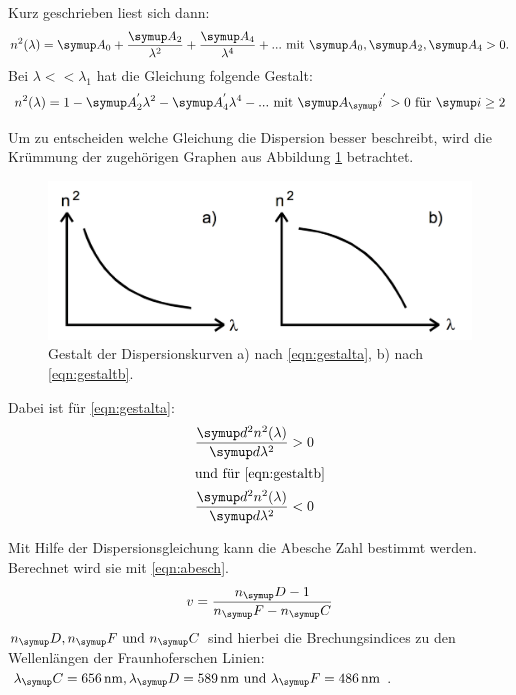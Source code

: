 Kurz geschrieben liest sich dann:
\begin{equation}
  n^2(\lambda) = \g{A}_0 + \frac{\g{A_2}}{\lambda^2} + \frac{\g{A_4}}{\lambda^4} + ...
  \text{~mit~} \g{A}_0, \g{A}_2, \g{A}_4 > 0.
  \label{eqn:gestalta}
\end{equation}
Bei $\lambda << \lambda_1$ hat die Gleichung folgende Gestalt:
\begin{equation}
  n^2(\lambda) = 1- \g{A}_2^{'} \lambda^2 - \g{A}_4^{'} \lambda^4 - ...
  \text{~mit~} \g{A}_\g{i}^{'} > 0 \text{~für~} \g{i} \geq 2
  \label{eqn:gestaltb}
\end{equation}

Um zu entscheiden welche Gleichung die Dispersion besser beschreibt, wird
die Krümmung der zugehörigen Graphen aus Abbildung \ref{fig:Dispersionskurven}
betrachtet.
\begin{figure}
  \centering
  \includegraphics[width = \textwidth]{Pics/Dispersionskurven.pdf}
  \caption{Gestalt der Dispersionskurven a) nach \eqref{eqn:gestalta}, b) nach \eqref{eqn:gestaltb}.}
  \label{fig:Dispersionskurven}
\end{figure}
Dabei ist für \eqref{eqn:gestalta}:
\begin{align*}
  \frac{\g{d}^2 n^2(\lambda)}{\g{d} \lambda^2} &> 0\\
  \intertext{und für \eqref{eqn:gestaltb}}
  \frac{\g{d}^2 n^2(\lambda)}{\g{d} \lambda^2} &< 0
\end{align*}

Mit Hilfe der Dispersionsgleichung kann die Abesche Zahl bestimmt werden.
Berechnet wird sie mit \eqref{eqn:abesch}.
\begin{equation}
  v = \frac{n_\g{D} -1 }{n_\g{F} - n_\g{C}}
  \label{eqn:abesch}
\end{equation}
$n_\g{D}, n_\g{F} \text{~und~} n_\g{C}$ sind hierbei die Brechungsindices zu den
Wellenlängen der Fraunhoferschen Linien: $\lambda_\g{C} = \SI{656}{\nano\meter},
\lambda_\g{D} = \SI{589}{\nano\meter} \text{~und~} \lambda_\g{F} = \SI{486}{\nano\meter}$.


